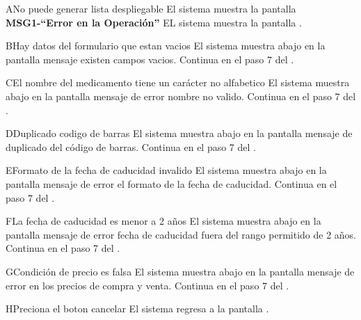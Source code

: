  \begin{UCtrayectoriaA}{A}{No puede generar lista despliegable}
 	\UCpaso El sistema muestra la pantalla {\bf MSG1-``Error en la Operación''}
 	\UCpaso EL sistema muestra la pantalla .
 \end{UCtrayectoriaA}
 \begin{UCtrayectoriaA}{B}{Hay datos del formulario que estan vacios}
 	\UCpaso El sistema muestra abajo en la pantalla mensaje existen campos vacios.
 	\UCpaso Continua en el paso 7 del .
 \end{UCtrayectoriaA}		
 \begin{UCtrayectoriaA}{C}{El nombre del medicamento tiene un carácter no alfabetico}
 	\UCpaso El sistema muestra abajo en la pantalla mensaje de error nombre no valido.
 	\UCpaso Continua en el paso 7 del .
 \end{UCtrayectoriaA}
 \begin{UCtrayectoriaA}{D}{Duplicado codigo de barras}
 	\UCpaso El sistema muestra abajo en la pantalla mensaje de duplicado del código de barras.
 	\UCpaso Continua en el paso 7 del .
 \end{UCtrayectoriaA}
 \begin{UCtrayectoriaA}{E}{Formato de la fecha de caducidad invalido}
 	\UCpaso El sistema muestra abajo en la pantalla mensaje de error el formato de la fecha de caducidad.
 	\UCpaso Continua en el paso 7 del .
 \end{UCtrayectoriaA}
 \begin{UCtrayectoriaA}{F}{La fecha de caducidad es menor a 2 años}
 	\UCpaso El sistema muestra abajo en la pantalla mensaje de error fecha de caducidad fuera del rango permitido de 2 años.
 	\UCpaso Continua en el paso 7 del .
 \end{UCtrayectoriaA}
 \begin{UCtrayectoriaA}{G}{Condición de precio es falsa}
 	\UCpaso El sistema muestra abajo en la pantalla mensaje de error en los precios de compra y venta.
 	\UCpaso Continua en el paso 7 del .
 \end{UCtrayectoriaA}
 \begin{UCtrayectoriaA}{H}{Preciona el boton cancelar}
 	\UCpaso El sistema regresa a la pantalla  .
 \end{UCtrayectoriaA}		
